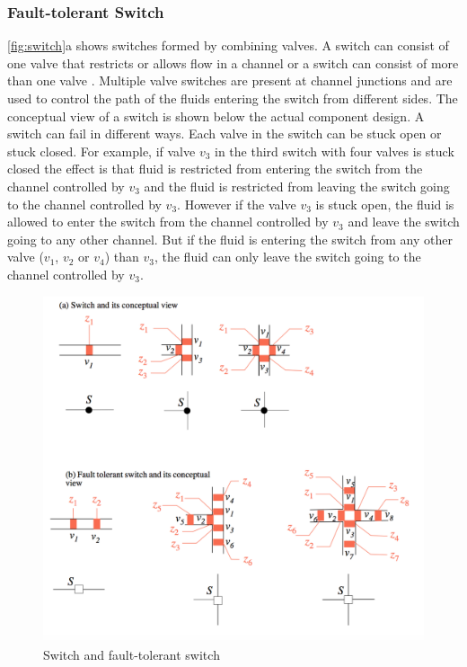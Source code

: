 \subsubsection{Fault-tolerant Switch}
\autoref{fig:switch}a shows switches formed by combining valves. A switch can consist of one valve that restricts or allows flow in a channel or a switch can consist of more than one valve \cite{wajid}. Multiple valve switches are present at channel junctions and are used to control the path of the fluids entering the switch from different sides. The conceptual view of a switch is shown below the actual component design. A switch can fail in different ways. Each valve in the switch can be stuck open or stuck closed. For example, if valve $v_3$ in the third switch with four valves is stuck closed the effect is that fluid is restricted from entering the switch from the channel controlled by $v_3$ and the fluid is restricted from leaving the switch going to the channel controlled by $v_3$. However if the valve $v_3$ is stuck open, the fluid is allowed to enter the switch from the channel controlled by $v_3$ and leave the switch going to any other channel. But if the fluid is entering the switch from any other valve ($v_1$, $v_2$ or $v_4$) than $v_3$, the fluid can only leave the switch going to the channel controlled by $v_3$.
\begin{figure}
\centering
\includegraphics[scale=0.4]{figures/switch.png}
\caption[Switch and fault-tolerant switch]{Switch and fault-tolerant switch}
\label{fig:switch}
\end{figure}

